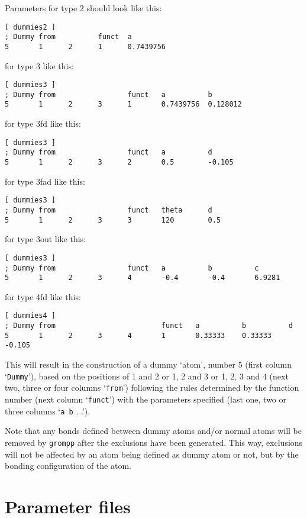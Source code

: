 Parameters for type 2 should look like this:
{\small\begin{verbatim}
[ dummies2 ] 
; Dummy from          funct  a 
5       1      2      1      0.7439756
\end{verbatim}}

for type 3 like this:
{\small\begin{verbatim}
[ dummies3 ]
; Dummy from                 funct   a          b
5       1      2      3      1       0.7439756  0.128012
\end{verbatim}}

for type 3fd like this:
{\small\begin{verbatim}
[ dummies3 ]
; Dummy from                 funct   a          d
5       1      2      3      2       0.5        -0.105
\end{verbatim}}

for type 3fad like this:
{\small\begin{verbatim}
[ dummies3 ]
; Dummy from                 funct   theta      d
5       1      2      3      3       120        0.5
\end{verbatim}}

for type 3out like this:
{\small\begin{verbatim}
[ dummies3 ]
; Dummy from                 funct   a          b          c
5       1      2      3      4       -0.4       -0.4       6.9281
\end{verbatim}}

for type 4fd like this:
{\small\begin{verbatim}
[ dummies4 ]
; Dummy from                         funct   a          b          d
5       1      2      3      4       1       0.33333    0.33333    -0.105
\end{verbatim}}

This will result in the construction of a dummy `atom', number 5
(first column `{\tt Dummy}'), based on the positions of 1 and 2 or 1,
2 and 3 or 1, 2, 3 and 4 (next two, three or four columns
`{\tt from}') following the rules determined by the function number
(next column `{\tt funct}') with the parameters specified (last one,
two or three columns `{\tt a b} . .').

Note that any bonds defined between dummy atoms and/or normal atoms
will be removed by {\tt grompp} after the exclusions have been
generated. This way, exclusions will not be affected by an atom being
defined as dummy atom or not, but by the bonding configuration of the
atom.

\section{Parameter files}
\label{sec:paramfiles}

